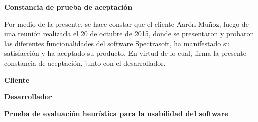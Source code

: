 \newpage
\begin{center}
	\textbf{Constancia de prueba de aceptaci\'{o}n}
\end{center}

Por medio de la presente, se hace constar que el cliente Aar\'{o}n Mu\~{n}oz, luego de una reuni\'{o}n realizada el 20 de octubre de 2015, donde se presentaron y probaron las diferentes funcionalidades del software Spectrasoft, ha manifestado su satisfacci\'{o}n y ha aceptado su producto. En virtud de lo cual, firma la presente constancia de aceptaci\'{o}n, junto con el desarrollador.

\null
\null
\null

\begin{minipage}[t]{0.45\textwidth}
	\begin{flushleft}
		\begin{center}
			\textbf{Cliente}
		\end{center}
	\end{flushleft}
\end{minipage}
\begin{minipage}[t]{0.45\textwidth}
	\begin{flushright}
		\begin{center}
			\textbf{Desarrollador}
		\end{center}
	\end{flushright}
\end{minipage}
\newpage
\begin{center}
	\textbf{Prueba de evaluaci\'{o}n heur\'{i}stica para la usabilidad del software}
\end{center}

